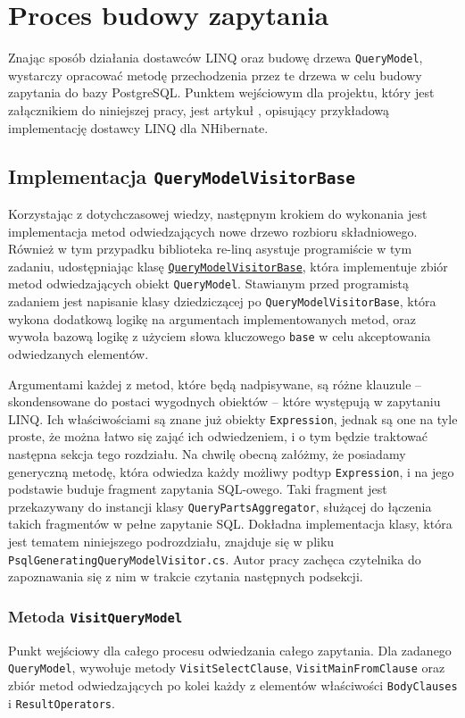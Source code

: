 \chapter{Proces budowy zapytania}
Znając sposób działania dostawców LINQ oraz budowę drzewa \texttt{QueryModel}, wystarczy opracować metodę przechodzenia przez te drzewa w celu budowy zapytania do bazy PostgreSQL. Punktem wejściowym dla projektu, który jest załącznikiem do niniejszej pracy, jest artykuł \cite{codeproject_nhibernate}, opisujący przykładową implementację dostawcy LINQ dla NHibernate.

\section{Implementacja \texttt{QueryModelVisitorBase}}
Korzystając z dotychczasowej wiedzy, następnym krokiem do wykonania jest implementacja metod odwiedzających nowe drzewo rozbioru składniowego. Również w tym przypadku biblioteka re-linq asystuje programiście w tym zadaniu, udostępniając klasę \href{https://github.com/re-motion/Relinq/blob/ab11f0997998a90e17e90dc58b215c3997d47311/Core/QueryModelVisitorBase.cs}{\texttt{QueryModelVisitorBase}}, która implementuje zbiór metod odwiedzających obiekt \texttt{QueryModel}. Stawianym przed programistą zadaniem jest napisanie klasy dziedziczącej po \texttt{QueryModelVisitorBase}, która wykona dodatkową logikę na argumentach implementowanych metod, oraz wywoła bazową logikę z użyciem słowa kluczowego \texttt{base} w celu akceptowania odwiedzanych elementów.

Argumentami każdej z metod, które będą nadpisywane, są różne klauzule – skondensowane do postaci wygodnych obiektów – które występują w zapytaniu LINQ. Ich właściwościami są znane już obiekty \texttt{Expression}, jednak są one na tyle proste, że można łatwo się zająć ich odwiedzeniem, i o tym będzie traktować następna sekcja tego rozdziału. Na chwilę obecną załóżmy, że posiadamy generyczną metodę, która odwiedza każdy możliwy podtyp \texttt{Expression}, i na jego podstawie buduje fragment zapytania SQL-owego. Taki fragment jest przekazywany do instancji klasy \texttt{QueryPartsAggregator}, służącej do łączenia takich fragmentów w pełne zapytanie SQL. Dokładna implementacja klasy, która jest tematem niniejszego podrozdziału, znajduje się w pliku \texttt{PsqlGeneratingQueryModelVisitor.cs}. Autor pracy zachęca czytelnika do zapoznawania się z nim w trakcie czytania następnych podsekcji.

\subsection{Metoda \texttt{VisitQueryModel}}
Punkt wejściowy dla całego procesu odwiedzania całego zapytania. Dla zadanego \texttt{QueryModel}, wywołuje metody \texttt{VisitSelectClause}, \texttt{VisitMainFromClause} oraz zbiór metod odwiedzających po kolei każdy z elementów właściwości \linebreak \texttt{BodyClauses} i \texttt{ResultOperators}.

